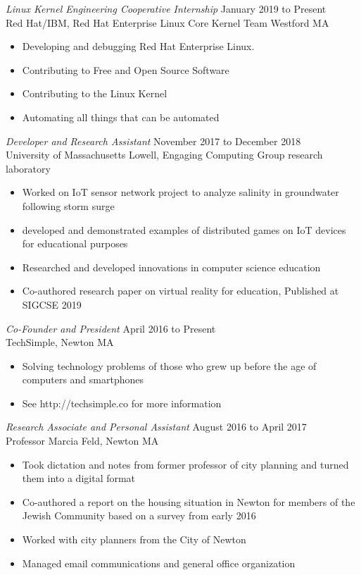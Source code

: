 \documentclass[margin]{res}
\begin{document}
\begin{resume}
{\sl Linux Kernel Engineering Cooperative Internship}
\hfill January 2019 to Present \\
Red Hat/IBM, 
Red Hat Enterprise Linux Core Kernel Team Westford MA
\begin{itemize} \itemsep -2pt
	\item Developing and debugging Red Hat Enterprise Linux. 
	\item Contributing to Free and Open Source Software
	\item Contributing to the Linux Kernel
	\item Automating all things that can be automated
\end{itemize}

{\sl Developer and Research Assistant}
\hfill November 2017 to December 2018 \\
University of Massachusetts Lowell,
Engaging Computing Group research laboratory
\begin{itemize} \itemsep -2pt
	\item Worked on IoT sensor network project to analyze salinity in
		groundwater following storm surge
	\item developed and demonstrated examples of distributed games on
		IoT devices for educational purposes
	\item Researched and developed innovations in computer science
		education
	\item Co-authored research paper on virtual reality for education,
		Published at SIGCSE 2019
\end{itemize} 
{\sl Co-Founder and President}
\hfill April 2016 to Present \\
TechSimple,
Newton MA
\begin{itemize} \itemsep -2pt
	\item Solving technology problems of those who grew up before the age
		of computers and smartphones
	\item See http://techsimple.co for more information
\end{itemize} 

{\sl Research Associate and Personal Assistant}
\hfill August 2016 to April 2017 \\
Professor Marcia Feld,
Newton MA
\begin{itemize} \itemsep -2pt
	\item Took dictation and notes from former professor of city planning
		and turned them into a digital format
	\item Co-authored a report on the housing situation in Newton for
		members of the Jewish Community based on a survey from early 2016
	\item Worked with city planners from the City of Newton
	\item Managed email communications and general office organization
\end{itemize} 
\end{resume}
\end{document}
